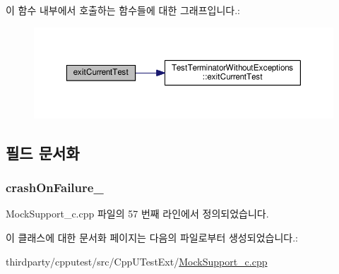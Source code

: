 이 함수 내부에서 호출하는 함수들에 대한 그래프입니다.\+:
\nopagebreak
\begin{figure}[H]
\begin{center}
\leavevmode
\includegraphics[width=350pt]{class_mock_failure_reporter_test_terminator_for_in_c_only_code_a3fca445c375314fd6d1d123473e00a38_cgraph}
\end{center}
\end{figure}




\subsection{필드 문서화}
\subsubsection[{\texorpdfstring{crash\+On\+Failure\+\_\+}{crashOnFailure_}}]{ crash\+On\+Failure\+\_\+\hspace{0.3cm}{\ttfamily [private]}}\hypertarget{class_mock_failure_reporter_test_terminator_for_in_c_only_code_a9faf961cbe6687577f4eaae4625bcbea}{}\label{class_mock_failure_reporter_test_terminator_for_in_c_only_code_a9faf961cbe6687577f4eaae4625bcbea}


Mock\+Support\+\_\+c.\+cpp 파일의 57 번째 라인에서 정의되었습니다.



이 클래스에 대한 문서화 페이지는 다음의 파일로부터 생성되었습니다.\+:\begin{DoxyCompactItemize}
\item 
thirdparty/cpputest/src/\+Cpp\+U\+Test\+Ext/\hyperlink{_mock_support__c_8cpp}{Mock\+Support\+\_\+c.\+cpp}\end{DoxyCompactItemize}

